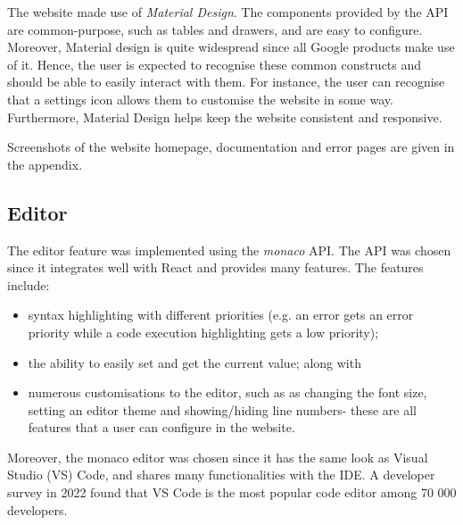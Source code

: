 
The website made use of \emph{Material Design}. The components provided by the API are common-purpose, such as tables and drawers, and are easy to configure. Moreover, Material design is quite widespread since all Google products make use of it. 
Hence, the user is expected to recognise these common constructs and should be able to easily interact with them. For instance, the user can recognise that a settings icon allows them to customise the website in some way. Furthermore, Material Design helps keep the website consistent and responsive.

Screenshots of the website homepage, documentation and error pages are given in the appendix.

\subsection{Editor}

The editor feature was implemented using the \emph{monaco} API. The API was chosen since it integrates well with React and provides many features. The features include:
\begin{itemize}
    \item syntax highlighting with different priorities (e.g. an error gets an error priority while a code execution highlighting gets a low priority);
    \item the ability to easily set and get the current value; along with
    \item numerous customisations to the editor, such as as changing the font size, setting an editor theme and showing/hiding line numbers- these are all features that a user can configure in the website.
\end{itemize}
Moreover, the monaco editor was chosen since it has the same look as Visual Studio (VS) Code, and shares many functionalities with the IDE. A developer survey in 2022 found that VS Code is the most popular code editor among 70 000 developers.

